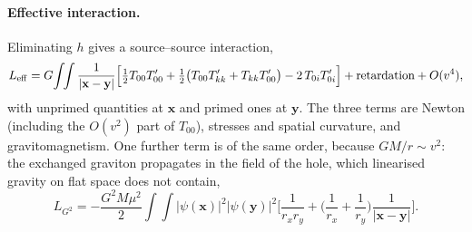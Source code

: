 \documentclass[11pt]{article}
\newcommand{\bx}{\mathbf{x}}\newcommand{\by}{\mathbf{y}}
\begin{document}
\paragraph{Effective interaction.} Eliminating $h$ gives a source--source interaction,
\begin{equation}
L_{\rm eff}=G\!\int\!\!\int\frac{1}{|\bx-\by|}\Big[\tfrac12T_{00}T'_{00}+\tfrac12\big(T_{00}T'_{kk}+T_{kk}T'_{00}\big)-2\,T_{0i}T'_{0i}\Big]
+\text{retardation}+O(v^4),
\end{equation}
with unprimed quantities at $\bx$ and primed ones at $\by$. The three terms are Newton (including the $O(v^2)$ part of $T_{00}$),
stresses and spatial curvature, and gravitomagnetism. One further term is of the same order, because $GM/r\sim v^2$: the exchanged
graviton propagates in the field of the hole, which linearised gravity on flat space does not contain,
\begin{equation}
L_{G^2}=-\frac{G^2M\mu^2}{2}\!\int\!\!\int|\psi(\bx)|^2|\psi(\by)|^2
\Big[\frac{1}{r_xr_y}+\Big(\frac1{r_x}+\frac1{r_y}\Big)\frac{1}{|\bx-\by|}\Big].
\end{equation}
\end{document}
